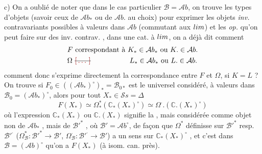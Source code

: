 \documentclass[11pt,a4paper]{article}
\begin{document}
c) On a oublié de noter que \struck{\ill{}} dans le cas particulier
$\mathcal{B} = \mathcal{A}b$, on trouve les  types d'objets (savoir
ceux de $\mathcal{A}b_{*}$ ou de $\mathcal{A}b.$ au choix) pour exprimer les objets
\emph{inv.} contravariants  possibles à valeurs dans $\mathcal{A}b$ (commutant
aux $\varprojlim$) et les \emph{op.} \add{$\Omega$} qu'on peut faire sur des inv.
contrav.    ,
dans une cat. \struck{\ill{}}  à $\varprojlim$, on a déjà dit comment
\[
  \begin{aligned}
    &F \text{ correspondant à } K_{*} \in \mathcal{A}b_{*} \text{ ou } K. \in \mathcal{A}b. \\
    &\Omega \text{ \struck{\ill{}} \quad\quad\quad\quad\quad } L_{*} \in \mathcal{A}b_{*} \text{ ou } L. \in \mathcal{A}b.
  \end{aligned}
\]
comment donc s'exprime directement la correspondance entre $F$ et $\Omega$, si
$K = L$ ? On trouve
si $F_{0} \in ((\mathcal{A}b_{*})^{\circ})_{*} = \mathcal{B}_{0*}$ 
est le \struck{\ill{}}  universel considéré, à valeurs dans
$\mathcal{B}_{0} = (\mathcal{A}b_{*})^{\circ}$, alors pour tout
$X_{*} \in \mathcal{S}s = \widehat{\Delta}$
\[
  \boxed{F(X_{*}) \simeq \Omega^{*}_{*}(\mathbb{C}_{*}(X_{*})^{\circ}) \simeq \Omega^{\cdot}.(\mathbb{C}.(X_{*})^{\circ})}
\]
où l'expression $\mathbb{C}_{*}(X_{*})$ ou $\mathbb{C}.(X_{*})$ signifie la ,
mais considérée comme objet non de $\mathcal{A}b_{*}$ , mais de
$\mathcal{B}'^{*}$ , où $\mathcal{B}' = \mathcal{A}b^{\circ}$,
de façon que $\Omega^{*}$ 
 définisse sur $\mathcal{B}'^{*}$ resp. $\mathcal{B}'^{\cdot}$
($\Omega^{*}_{\mathcal{B}} : \mathcal{B}'^{*} \to \mathcal{B}'$,
$\Omega^{\cdot}_{\mathcal{B}} : \mathcal{B}'^{\cdot} \to \mathcal{B}'$) a un sens
sur $\mathbb{C}_{*}(X_{*})^{\circ}$ , et c'est
 dans $\mathcal{B} = (\mathcal{A}b)^{\circ}$ qu'on a $F(X_{*})$
(à isom. can. près).
\end{document}
